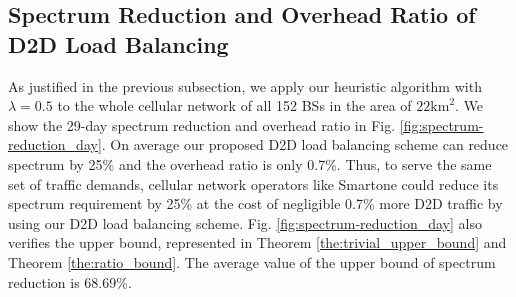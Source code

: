 \subsection{Spectrum Reduction and Overhead Ratio of D2D Load Balancing}






As justified in the previous subsection, we apply our heuristic algorithm with $\lambda=0.5$ to
the whole cellular network of all 152 BSs in the area of $22\text{km}^2$.
We show the 29-day spectrum reduction and overhead ratio in Fig. \ref{fig:spectrum-reduction_day}.
On average our proposed D2D load balancing scheme
can reduce spectrum by 25\% and the overhead ratio is only 0.7\%. Thus,
to serve the same set of traffic demands, cellular network operators like Smartone could
reduce its spectrum requirement by 25\% at the cost of negligible 0.7\% more D2D traffic
by using our D2D load balancing scheme.
Fig. \ref{fig:spectrum-reduction_day} also verifies the upper bound, represented in Theorem \ref{the:trivial_upper_bound} and Theorem \ref{the:ratio_bound}.
The average value of the upper bound of spectrum reduction is  68.69\%.










